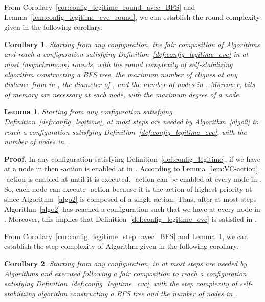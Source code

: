 \documentclass[11pt,letterpaper,onecolumn]{article}
\newtheorem{corollary}{Corollary}
\newtheorem{lemma}{Lemma}
\newenvironment{proof}{\noindent \begin{rm}{\textbf{Proof.} }}{\hspace*{\fill}\par\end{rm} \vspace{.3cm}}
\begin{document}
From Corollary~\ref{cor:config_legitime_round_avec_BFS} and Lemma~\ref{lem:config_legitime_cvc_round}, we can establish the round complexity given in the following corollary.

\begin{corollary}
Starting from any configuration, the fair composition of Algorithms  and  reach a configuration satisfying Definition~\ref{def:config_legitime_cvc} in at most  (asynchronous) rounds, with  the round complexity of self-stabilizing algorithm  constructing a BFS tree,  the maximum number of cliques at any distance from  in ,  the diameter of , and  the number of nodes in . Moreover,  bits of memory are necessary at each node, with  the maximum degree of a node.
\end{corollary}

\begin{lemma}
\label{lem:config_legitime_cvc_step}
Starting from any configuration satisfying Definition~\ref{def:config_legitime}, at most  steps are needed by Algorithm~\ref{algo2} to reach a configuration satisfying Definition~\ref{def:config_legitime_cvc}, with  the number of nodes in .
\end{lemma}

\begin{proof}
In any configuration  satisfying Definition~\ref{def:config_legitime}, if we have  at a node  in  then -action is enabled at  in . According to Lemma~\ref{lem:VC-action}, -action is enabled at  until it is executed. -action can be enabled at every node  in . So, each node  can execute -action because it is the action of highest priority at  since Algorithm~\ref{algo2} is composed of a single action. Thus, after at most  steps Algorithm~\ref{algo2} has reached a configuration  such that we have  at every node  in . Moreover, this implies that Definition~\ref{def:config_legitime_cvc} is satisfied in .
\end{proof}

From Corollary~\ref{cor:config_legitime_step_avec_BFS} and Lemma~\ref{lem:config_legitime_cvc_step}, we can establish the step complexity of Algorithm  given in the following corollary.

\begin{corollary}
Starting from any configuration, in at most  steps are needed by Algorithms  and  executed following a fair composition to reach a configuration satisfying Definition~\ref{def:config_legitime_cvc}, with  the step complexity of self-stabilizing algorithm  constructing a BFS tree and  the number of nodes in .
\end{corollary}
\end{document}
